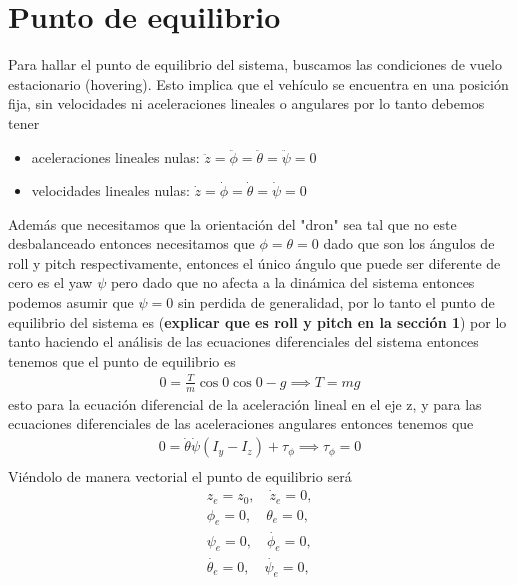 \documentclass{uofa-eng-assignment}
\begin{document}
\section{Punto de equilibrio}
Para hallar el punto de equilibrio del sistema, buscamos las condiciones de vuelo estacionario (hovering). 
Esto implica que el vehículo se encuentra en una posición fija, sin velocidades ni aceleraciones lineales o angulares
por lo tanto debemos tener
\begin{itemize}
    \item aceleraciones lineales nulas: $\ddot{z}=\ddot{\phi}=\ddot{\theta}=\ddot{\psi}=0$
    \item velocidades lineales nulas: $\dot{z}=\dot{\phi}=\dot{\theta}=\dot{\psi}=0$
\end{itemize}
Además que necesitamos que la orientación del "dron" sea tal que no este desbalanceado entonces 
necesitamos que $\phi=\theta=0$ dado que son los ángulos de roll y pitch respectivamente, 
entonces el único ángulo que puede ser diferente de cero es el yaw $\psi$ 
pero dado que no afecta a la dinámica del sistema entonces podemos asumir que $\psi=0$ 
sin perdida de generalidad, por lo tanto el punto de equilibrio del sistema 
es (\textbf{explicar que es roll y pitch en la sección 1})
por lo tanto haciendo el análisis de las ecuaciones diferenciales del sistema entonces tenemos que el punto de equilibrio es
\begin{align*}
    0= \frac{T}{m} \cos 0 \cos 0 - g \implies T=mg
\end{align*}
esto para la ecuación diferencial de la aceleración lineal en el eje z, 
y para las ecuaciones diferenciales de las aceleraciones angulares entonces tenemos que
\begin{align*}
    0 = \dot{\theta}\dot{\psi}(I_y - I_z) + \tau_\phi \implies \tau_\phi=0 \\
\end{align*}
Viéndolo de manera vectorial el punto de equilibrio será 
\begin{align*}
    z_e = z_0 , \quad
    \dot{z}_e = 0, \\ 
    \phi_e = 0, \quad
    \theta_e=0, \\
    \psi_e = 0, \quad
    \dot{\phi_e}=0,\\
    \dot{\theta_e}=0, \quad
    \dot{\psi_e}=0,\\
\end{align*}
\end{document}
